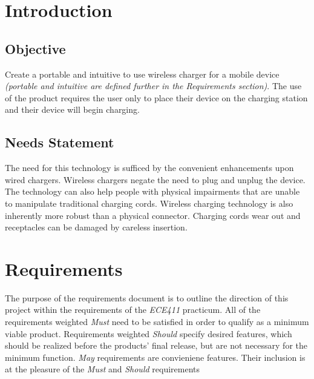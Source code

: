 


\section{Introduction}

    \subsection{Objective}
    
     Create a portable and intuitive to use wireless charger for a mobile device \textit{(portable and intuitive are defined further in the Requirements section)}. The use of the product requires the user only to place their device on the charging station and their device will begin charging.
    
    \subsection{Needs Statement}
     The need for this technology is sufficed by the convenient enhancements upon wired chargers. Wireless chargers negate the need to plug and unplug the device. The technology can also help people with physical impairments that are unable to manipulate traditional charging cords.
     Wireless charging technology is also inherently more robust than a physical connector. Charging cords wear out and receptacles can be damaged by careless insertion.


\section{Requirements}

The purpose of the requirements document is to outline the direction of this project within the requirements of the \textit{ECE411} practicum. All of the requirements weighted \textit{Must} need to be satisfied in order to qualify as a minimum viable product. Requirements weighted \textit{Should} specify desired features, which should be realized before the products' final release, but are not necessary for the minimum function. \textit{May} requirements are convieniene features. Their inclusion is at the pleasure of the \textit{Must} and \textit{Should} requirements

